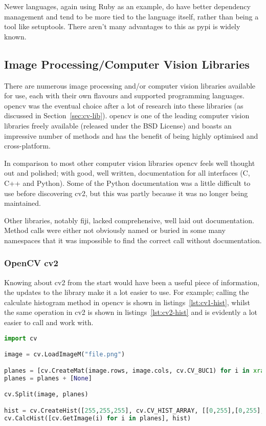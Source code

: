 Newer languages, again using Ruby as an example, do have better dependency management and tend to
be more tied to the language itself, rather than being a tool like setuptools. There aren't
many advantages to this as \gls{pypi} is widely known.


\subsection{Image Processing/Computer Vision Libraries}
There are numerous image processing and/or computer vision libraries available for use, each with
their own flavours and supported programming languages. \gls{opencv} was the eventual choice after a lot
of research into these libraries (as discussed in Section~\ref{sec:cv-lib}). \gls{opencv} is one
of the leading computer vision libraries freely available (released under the BSD License) and 
boasts an impressive number of methods and has the benefit of being highly optimised and 
cross-platform.

In comparison to most other computer vision libraries \gls{opencv} feels well thought out and 
polished; with good, well written, documentation for all interfaces (C, C++ and Python). Some of
the Python documentation was a little difficult to use before discovering \gls{cv2}, but this was 
partly because it was no longer being maintained.

Other libraries, notably \gls{fiji}, lacked comprehensive, well laid out documentation. Method 
calls were either not obviously named or buried in some many namespaces that it was impossible to
find the correct call without documentation.


\subsubsection{OpenCV cv2}
Knowing about \gls{cv2} from the start would have been a useful piece of information, the
updates to the library make it a lot easier to use. For example; calling the calculate histogram
method in \gls{opencv} is shown in listings~\ref{lst:cv1-hist}, whilst the same operation in 
\gls{cv2} is shown in listings~\ref{lst:cv2-hist} and is evidently a lot easier to call
and work with.



\begin{lstlisting}[language=python, caption={Creating a Histogram in OpenCV}, label=lst:cv1-hist, 
breaklines=true, frame=single]
import cv

image = cv.LoadImageM("file.png")

planes = [cv.CreateMat(image.rows, image.cols, cv.CV_8UC1) for i in xrange(3)]
planes = planes + [None]

cv.Split(image, planes)

hist = cv.CreateHist([255,255,255], cv.CV_HIST_ARRAY, [[0,255],[0,255],[0,255]], 1)
cv.CalcHist([cv.GetImage(i) for i in planes], hist)
\end{lstlisting}


